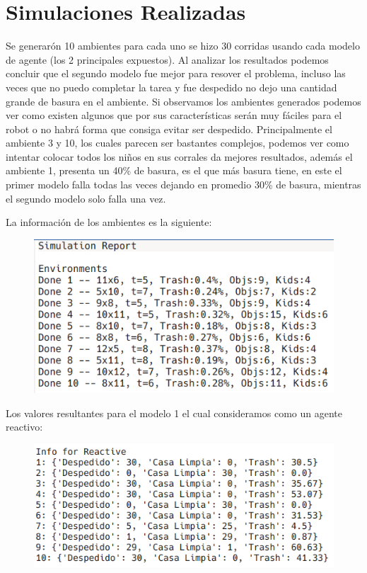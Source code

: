 \documentclass[a4paper,10pt,twocolumn]{article}
\begin{document}
\section*{Simulaciones Realizadas}

Se generar\'on 10 ambientes para cada uno se hizo 30 corridas usando cada modelo de agente (los 2 principales expuestos). Al analizar los resultados podemos concluir que el segundo modelo fue mejor para resover el problema, incluso las veces que no puedo completar la tarea y fue despedido no dejo una cantidad grande de basura en el ambiente. Si observamos los ambientes generados podemos ver como existen algunos que por sus caracter\'isticas ser\'an muy f\'aciles para el robot o no habr\'a forma que consiga evitar ser despedido. Principalmente el ambiente 3 y 10, los cuales parecen ser bastantes complejos, podemos ver como intentar colocar todos los ni\~nos en sus corrales da mejores resultados, adem\'as el ambiente 1, presenta un 40\% de basura, es el que m\'as basura tiene, en este el primer modelo falla todas las veces dejando en promedio 30\% de basura, mientras el segundo modelo solo falla una vez.

La informaci\'on de los ambientes es la siguiente:

\begin{figure}[h]
	\includegraphics[scale=0.64]{./imgs/envs}
\end{figure}

Los valores resultantes para el modelo 1 el cual consideramos como un agente reactivo:

\begin{figure}[h]
	\includegraphics[scale=0.65]{./imgs/reactive}
\end{figure}
\end{document}
